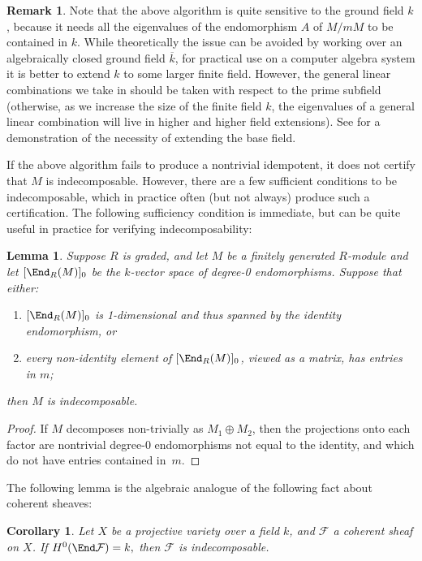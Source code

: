 \documentclass[12pt]{article}
\let\bar\overline
\def\cF{\mathcal F}
\theoremstyle{theorem}
\numberwithin{thm}{section}
\newtheorem{lem}[thm]{Lemma}
\newtheorem{cor}[thm]{Corollary}
\theoremstyle{definition}
\newtheorem{rem}[thm]{Remark}
\begin{document}
\begin{rem}
  Note that the above algorithm is quite sensitive to the ground field $k$, because it needs all the eigenvalues of the endomorphism $A$ of $M/mM$ to be contained in $k$. While theoretically the issue can be avoided by working over an algebraically closed ground field $\bar k$, for practical use on a computer algebra system it is better to extend $k$ to some larger finite field. However, the general linear combinations we take in  should be taken with respect to the prime subfield (otherwise, as we increase the size of the finite field $k$, the eigenvalues of a general linear combination will live in higher and higher field extensions).
See  for a demonstration of the necessity of extending the base field.
\end{rem}

If the above algorithm fails to produce a nontrivial idempotent, it does not certify that $M$ is indecomposable. However, there are a few sufficient conditions to be indecomposable, which in practice often (but not always) produce such a certification.
The following sufficiency condition is immediate, but can be quite useful in practice for verifying indecomposability:

\begin{lem}
  Suppose $R$ is graded, and let $M$ be a finitely generated $R$-module and let $[\End_R(M)]_0$ be the $k$-vector space of degree-0 endomorphisms. Suppose that either:
  \begin{enumerate}
  \item $[\End_R(M)]_0$ is 1-dimensional and thus spanned by the identity endomorphism, or
  \item every non-identity element of $[\End_R(M)]_0$, viewed as a matrix, has entries in $m$;
  \end{enumerate}
  then $M$ is indecomposable.
\end{lem}

\begin{proof}
  If $M$ decomposes non-trivially as $M_1\oplus M_2$, then the projections onto each factor are nontrivial degree-0 endomorphisms not equal to the identity, and which do not have entries contained in~$m$.
\end{proof}

The following lemma is the algebraic analogue of the following fact about coherent sheaves:

\begin{cor}
  Let $X$ be a projective variety over a field $k$, and $\cF$ a coherent sheaf on $X$.
  If $ H^0(\End \cF) = k, $ then $\cF$ is indecomposable.
\end{cor}
\end{document}

